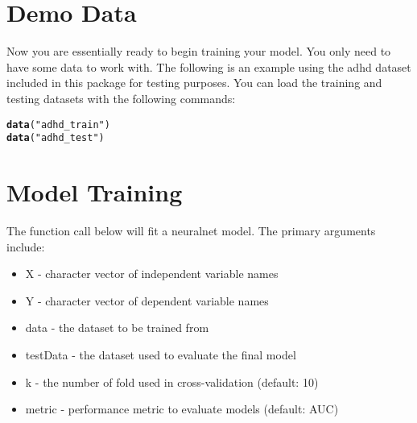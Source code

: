 \documentclass[12pt]{article}\usepackage[]{graphicx}\usepackage[]{color}
\makeatletter
\newcommand{\hlstr}[1]{\textcolor[rgb]{0.192,0.494,0.8}{#1}}%
\newcommand{\hlstd}[1]{\textcolor[rgb]{0.345,0.345,0.345}{#1}}%
\newcommand{\hlkwd}[1]{\textcolor[rgb]{0.737,0.353,0.396}{\textbf{#1}}}%
\newenvironment{kframe}{%
 \def\at@end@of@kframe{}%
 \ifinner\ifhmode%
  \def\at@end@of@kframe{\end{minipage}}%
  \begin{minipage}{\columnwidth}%
 \fi\fi%
 \def\FrameCommand##1{\hskip\@totalleftmargin \hskip-\fboxsep
 \colorbox{shadecolor}{##1}\hskip-\fboxsep
     \hskip-\linewidth \hskip-\@totalleftmargin \hskip\columnwidth}%
 \MakeFramed {\advance\hsize-\width
   \@totalleftmargin\z@ \linewidth\hsize
   \@setminipage}}%
 {\par\unskip\endMakeFramed%
 \at@end@of@kframe}
\newenvironment{knitrout}{}{} %
\makeatother
\begin{document}
\section{Demo Data}
Now you are essentially ready to begin training your model.  You only need to have some data to work
with.  The following is an example using the adhd dataset included in this package for testing 
purposes.  You can load the training and testing datasets with the following commands:

\begin{knitrout}
\color{fgcolor}\begin{kframe}
\begin{alltt}
\hlkwd{data}\hlstd{(}\hlstr{"adhd_train"}\hlstd{)}
\hlkwd{data}\hlstd{(}\hlstr{"adhd_test"}\hlstd{)}
\end{alltt}
\end{kframe}
\end{knitrout}

\newpage
\maketitle
\section{Model Training}
The function call below will fit a neuralnet model.  The primary arguments include:

\begin{itemize}
\item X - character vector of independent variable names
\item Y - character vector of dependent variable names
\item data - the dataset to be trained from
\item testData - the dataset used to evaluate the final model
\item k - the number of fold used in cross-validation (default: 10)
\item metric - performance metric to evaluate models (default: AUC)
\end{itemize}
             
\end{document}
